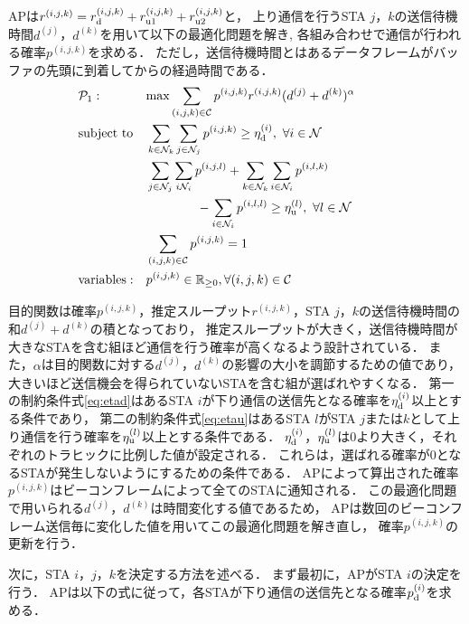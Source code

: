 \documentclass[technicalreport]{ieicej}
\newcommand{\pijk}{p^{(i,j,k)}}
\newcommand{\rijk}{r^{(i,j,k)}}
\newcommand{\mthni}{{\mathcal N}_i}
\newcommand{\mthnj}{{\mathcal N}_j}
\newcommand{\mthnk}{{\mathcal N}_k}
\begin{document}
		APは$\rijk=r^{(i,j,k)}_{\rm d}+r^{(i,j,k)}_{\rm u1}+r^{(i,j,k)}_{\rm u2}$と，
		上り通信を行うSTA $j$，$k$の送信待機時間$d^{(j)}$，$d^{(k)}$を用いて以下の最適化問題を解き,
		各組み合わせで通信が行われる確率$p^{(i,j,k)}$を求める．
		ただし，送信待機時間とはあるデータフレームがバッファの先頭に到着してからの経過時間である．
		\begin{align}
			&{\mathcal P}_1: && {\rm max} \sum_{(i,j,k)\in{\mathcal C}} p^{(i,j,k)}r^{(i,j,k)}(d^{(j)}+d^{(k)})^{\alpha} &&&&&&\\
			&{\rm subject\ to} && \sum_{k\in\mthnk} \sum_{j\in\mthnj} p^{(i,j,k)} \geq \eta_{\rm d}^{(i)},\ \forall i\in {\mathcal N} \label{eq:etad} \\
			&&& \sum_{j\in\mthnj} \sum_{i\mthni} p^{(i,j,l)}+\sum_{k\in\mthnk} \sum_{i\in\mthni} p^{(i,l,k)} \nonumber\\
			&&&\qquad\qquad- \sum_{i\in\mthni} p^{(i,l,l)} \geq \eta_{\rm u}^{(l)},\ \forall l\in {\mathcal N} \label{eq:etau} \\
			&&& \sum_{(i,j,k)\in{\mathcal C}} p^{(i,j,k)}=1 \\
			&{\rm variables:} &&p^{(i,j,k)} \in {\mathbb R}_{\geq 0},\forall(i,j,k)\in {\mathcal C}
		\end{align}
		\par
		目的関数は確率$\pijk$，推定スループット$\rijk$，STA $j$，$k$の送信待機時間の和$d^{(j)}+d^{(k)}$の積となっており，
		推定スループットが大きく，送信待機時間が大きなSTAを含む組ほど通信を行う確率が高くなるよう設計されている．
		また，$\alpha$は目的関数に対する$d^{(j)}$，$d^{(k)}$の影響の大小を調節するための値であり，
		大きいほど送信機会を得られていないSTAを含む組が選ばれやすくなる．
		第一の制約条件式\eqref{eq:etad}はあるSTA $i$が下り通信の送信先となる確率を$\eta_{\rm d}^{(i)}$以上とする条件であり，
		第二の制約条件式\eqref{eq:etau}はあるSTA $l$がSTA $j$または$k$として上り通信を行う確率を$\eta_{\rm u}^{(l)}$以上とする条件である．
		$\eta_{\rm d}^{(i)}$，$\eta_{\rm u}^{(l)}$は0より大きく，それぞれのトラヒックに比例した値が設定される．
		これらは，選ばれる確率が0となるSTAが発生しないようにするための条件である．
		APによって算出された確率$\pijk$はビーコンフレームによって全てのSTAに通知される．
		この最適化問題で用いられる$d^{(j)}$，$d^{(k)}$は時間変化する値であるため，
		APは数回のビーコンフレーム送信毎に変化した値を用いてこの最適化問題を解き直し，
		確率$\pijk$の更新を行う．
		\par
		次に，STA $i$，$j$，$k$を決定する方法を述べる．
		まず最初に，APがSTA $i$の決定を行う．
		APは以下の式に従って，各STAが下り通信の送信先となる確率$p_{\rm d}^{(i)}$を求める．
\end{document}
